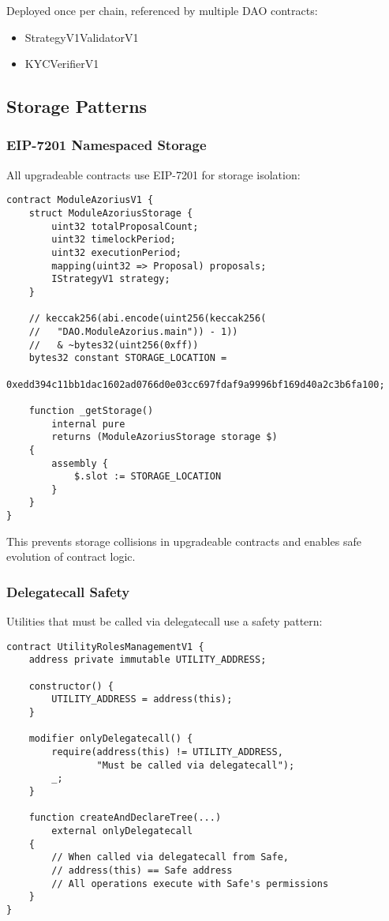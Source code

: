 \documentclass[11pt,a4paper]{article}
\begin{document}
Deployed once per chain, referenced by multiple DAO contracts:
\begin{itemize}
    \item StrategyV1ValidatorV1
    \item KYCVerifierV1
\end{itemize}

\subsection{Storage Patterns}

\subsubsection{EIP-7201 Namespaced Storage}

All upgradeable contracts use EIP-7201 \cite{eip7201} for storage isolation:

\begin{lstlisting}[caption=Namespaced Storage Pattern]
contract ModuleAzoriusV1 {
    struct ModuleAzoriusStorage {
        uint32 totalProposalCount;
        uint32 timelockPeriod;
        uint32 executionPeriod;
        mapping(uint32 => Proposal) proposals;
        IStrategyV1 strategy;
    }

    // keccak256(abi.encode(uint256(keccak256(
    //   "DAO.ModuleAzorius.main")) - 1))
    //   & ~bytes32(uint256(0xff))
    bytes32 constant STORAGE_LOCATION =
        0xedd394c11bb1dac1602ad0766d0e03cc697fdaf9a9996bf169d40a2c3b6fa100;

    function _getStorage()
        internal pure
        returns (ModuleAzoriusStorage storage $)
    {
        assembly {
            $.slot := STORAGE_LOCATION
        }
    }
}
\end{lstlisting}

This prevents storage collisions in upgradeable contracts and enables safe evolution of contract logic.

\subsubsection{Delegatecall Safety}

Utilities that must be called via delegatecall use a safety pattern:

\begin{lstlisting}[caption=Delegatecall Detection]
contract UtilityRolesManagementV1 {
    address private immutable UTILITY_ADDRESS;

    constructor() {
        UTILITY_ADDRESS = address(this);
    }

    modifier onlyDelegatecall() {
        require(address(this) != UTILITY_ADDRESS,
                "Must be called via delegatecall");
        _;
    }

    function createAndDeclareTree(...)
        external onlyDelegatecall
    {
        // When called via delegatecall from Safe,
        // address(this) == Safe address
        // All operations execute with Safe's permissions
    }
}
\end{lstlisting}
\end{document}
